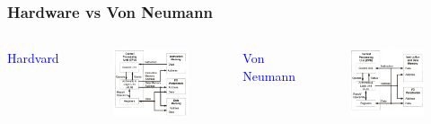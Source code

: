 \documentclass[10.5pt,scale=1.0,t,aspectratio=169,hyperref={pdfpagelabels=false}]{beamer}
\begin{document}
\begin{frame}
	\frametitle{Hardware vs Von Neumann}
		
	\begin{columns}
		\textcolor{blue}{Hardvard}
		\begin{figure}
			\centering
			\includegraphics[scale=0.5]{Harvard}
		\end{figure}
	
		\textcolor{blue}{Von Neumann}
		\begin{figure}
			\centering
			\includegraphics[scale=0.5]{VonNeumann}
		\end{figure}
	\end{columns}
\end{frame}
\end{document}
